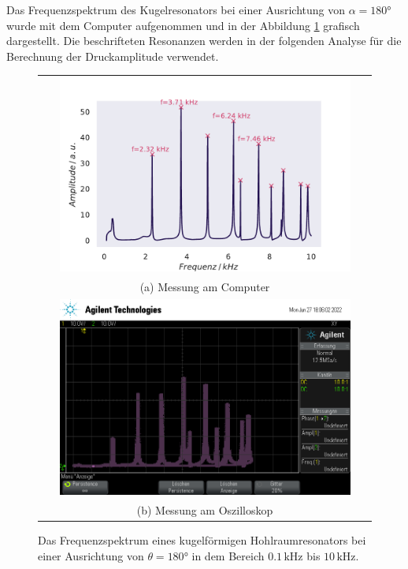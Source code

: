 Das Frequenzspektrum des Kugelresonators bei einer Ausrichtung von $\alpha = 180°$ wurde mit dem Computer aufgenommen und in der Abbildung \ref{fig:h180} grafisch dargestellt. 
Die beschrifteten Resonanzen werden in der folgenden Analyse für die Berechnung der Druckamplitude verwendet. 
\begin{figure}[H]
    \centering
    \begin{tabular}{c}
    \includegraphics[width=0.9\textwidth]{Daten/Wasserstoff/neu/H_180.pdf} \\
    (a) Messung am Computer \\[6pt]
    \includegraphics[width=0.9\textwidth]{Daten/Oszilloskop/scope_4.png} \\
    (b) Messung am Oszilloskop \\[6pt]
    \end{tabular}
    \caption{Das Frequenzspektrum eines kugelförmigen Hohlraumresonators bei einer Ausrichtung von $\theta = 180\si{°}$ in dem Bereich $0.1 \,\si{\kilo\hertz}$ bis $10 \,\si{\kilo\hertz}$. }
    \label{fig:h180}
\end{figure}

